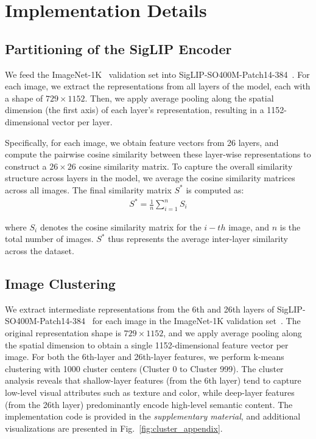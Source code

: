 \section{Implementation Details}
\label{appendix_implementation}

\subsection{Partitioning of the SigLIP Encoder}
\label{partitioning}

We feed the ImageNet-1K~\citep{deng2009imagenet} validation set into SigLIP-SO400M-Patch14-384~\citep{zhai2023siglip}. For each image, we extract the representations from all layers of the model, each with a shape of $729\times1152$. Then, we apply average pooling along the spatial dimension (the first axis) of each layer's representation, resulting in a 1152-dimensional vector per layer.

Specifically, for each image, we obtain feature vectors from 26 layers, and compute the pairwise cosine similarity between these layer-wise representations to construct a $26\times26$ cosine similarity matrix.
To capture the overall similarity structure across layers in the model, we average the cosine similarity matrices across all images. The final similarity matrix $S^*$ is computed as:
\begin{equation}
\begin{aligned}
    S^* = \frac{1}{n} \sum_{i=1}^{n} S_i
\end{aligned}
\end{equation}

where $S_i$ denotes the cosine similarity matrix for the $i-th$ image, and $n$ is the total number of images. $S^*$ thus represents the average inter-layer similarity across the dataset.

\subsection{Image Clustering}
We extract intermediate representations from the 6th and 26th layers of SigLIP-SO400M-Patch14-384~\citep{zhai2023siglip} for each image in the ImageNet-1K validation set~\citep{deng2009imagenet}. The original representation shape is $729 \times 1152$, and we apply average pooling along the spatial dimension to obtain a single 1152-dimensional feature vector per image.
For both the 6th-layer and 26th-layer features, we perform k-means clustering with 1000 cluster centers (Cluster 0 to Cluster 999). The cluster analysis reveals that shallow-layer features (from the 6th layer) tend to capture low-level visual attributes such as texture and color, while deep-layer features (from the 26th layer) predominantly encode high-level semantic content.
The implementation code is provided in the \textit{supplementary material}, and additional visualizations are presented in Fig.~\ref{fig:cluster_appendix}.

